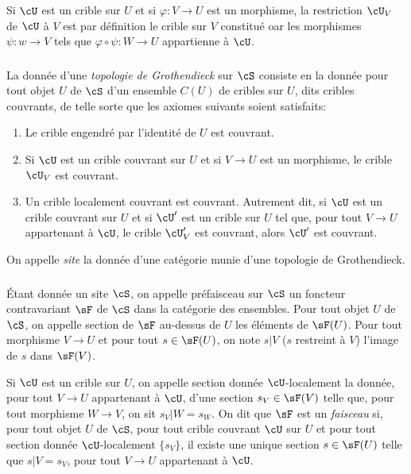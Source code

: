 Si $\cU$ est un crible sur $U$ et si $\varphi:V\to U$ est un morphisme, la 
restriction $\cU_V$ de $\cU$ à $V$ est par définition le crible sur $V$ 
constitué oar les morphismes $\psi:w\to V$ tels que 
$\varphi\circ\psi:W\to U$ appartienne à $\cU$.





\subsubsection{}\label{I:1-6-2}

La donnée d'une \emph{topologie de Grothendieck} sur $\cS$ consiste en la 
donnée pour tout objet $U$ de $\cS$ d'un ensemble $C(U)$ de cribles sur $U$, 
dits cribles couvrants, de telle sorte que les axiomes suivants soient 
satisfaits:
\begin{enumerate}[\indent a)]
  \item Le crible engendré par l'identité de $U$ est couvrant.
  \item Si $\cU$ est un crible couvrant sur $U$ et si $V\to U$ est un 
    morphisme, le crible $\cU_V$ est couvrant.
  \item Un crible localement couvrant est couvrant. Autrement dit, si $\cU$ est 
    un crible couvrant sur $U$ et si $\cU'$ est un crible sur $U$ tel que, pour 
    tout $V\to U$ appartenant à $\cU$, le crible $\cU_V'$ est couvrant, alors 
    $\cU'$ est couvrant.
\end{enumerate}

On appelle \emph{site} la donnée d'une catégorie munie d'une topologie de 
Grothendieck.





\subsubsection{}\label{I:1-6-3}

Étant donnée un site $\cS$, on appelle préfaisceau sur $\cS$ un foncteur 
contravariant $\sF$ de $\cS$ dans la catégorie des ensembles. Pour tout 
objet $U$ de $\cS$, on appelle section de $\sF$ au-dessus de $U$ les 
éléments de $\sF(U)$. Pour tout morphisme $V\to U$ et pour tout 
$s\in \sF(U)$, on note $s|V$ ($s$ restreint à $V$) l'image de $s$ dans 
$\sF(V)$.

Si $\cU$ est un crible sur $U$, on appelle section donnée $\cU$-localement la 
donnée, pour tout $V\to U$ appartenant à $\cU$, d'une section 
$s_V\in\sF(V)$ telle que, pour tout morphisme $W\to V$, on sit $s_V|W=s_W$. On 
dit que $\sF$ est un \emph{faisceau} si, pour tout objet $U$ de $\cS$, pour 
tout crible couvrant $\cU$ sur $U$ et pour tout section donnée 
$\cU$-localement $\{s_V\}$, il existe une unique section $s\in\sF(U)$ telle que 
$s|V=s_V$, pour tout $V\to U$ appartenant à $\cU$. 

